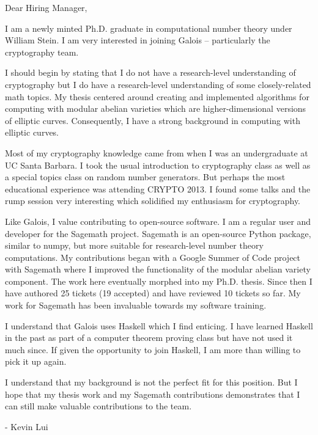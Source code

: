 \documentclass{letter}
\begin{document}
\begin{letter}
    \opening{Dear Hiring Manager,}

    I am a newly minted Ph.D. graduate in computational number theory under
    William Stein. I am very interested in joining Galois -- particularly the
    cryptography team.
    
    I should begin by stating that I do not have a research-level understanding
    of cryptography but I do have a research-level understanding of some
    closely-related math topics. My thesis centered around creating and
    implemented algorithms for computing with modular abelian varieties which
    are higher-dimensional versions of elliptic curves. Consequently, I have a
    strong background in computing with elliptic curves.

    Most of my cryptography knowledge came from when I was an undergraduate at
    UC Santa Barbara. I took the usual introduction to cryptography class as
    well as a special topics class on random number generators. But perhaps the
    most educational experience was attending CRYPTO 2013. I found some talks
    and the rump session very interesting which solidified my enthusiasm for
    cryptography.  

    Like Galois, I value contributing to open-source software. I am a regular
    user and developer for the Sagemath project. Sagemath is an open-source
    Python package, similar to numpy, but more suitable for research-level
    number theory computations. My contributions began with a Google Summer of
    Code project with Sagemath where I improved the functionality of the
    modular abelian variety component. The work here eventually morphed into my
    Ph.D. thesis. Since then I have authored 25 tickets (19 accepted) and
    have reviewed 10 tickets so far. My work for Sagemath has been invaluable
    towards my software training.

    I understand that Galois uses Haskell which I find enticing. I have learned
    Haskell in the past as part of a computer theorem proving class but have
    not used it much since. If given the opportunity to join Haskell, I am more
    than willing to pick it up again.

    I understand that my background is not the perfect fit for this position.
    But I hope that my thesis work and my Sagemath contributions demonstrates
    that I can still make valuable contributions to the team.

    \closing{- Kevin Lui}

\end{letter}
\end{document}
